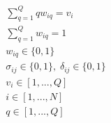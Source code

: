 \begin{subequations}
\begin{align}
    \sum_{q=1}^Q qw_{iq} = v_i                                              \label{subeq:wmax}           \\
    \sum_{q=1}^Q w_{iq} = 1                                                 \label{subeq:wone}           \\
    w_{iq} \in \{0,1\}                                                      \label{subeq:wspace}         \\
    \sigma_{ij} \in \{0,1\},\;\delta_{ij} \in \{0,1\}\;                     \label{subeq:ssdspace}        \\
    v_i \in  [1,...,Q ]                                                     \label{subeq:vvspace}        \\
    i \in [1,...,N]                                                        \label{subeq:vispace}         \\
    q \in [1,...,Q] 							   \label{subeq:qspace}
\end{align}
\end{subequations}
